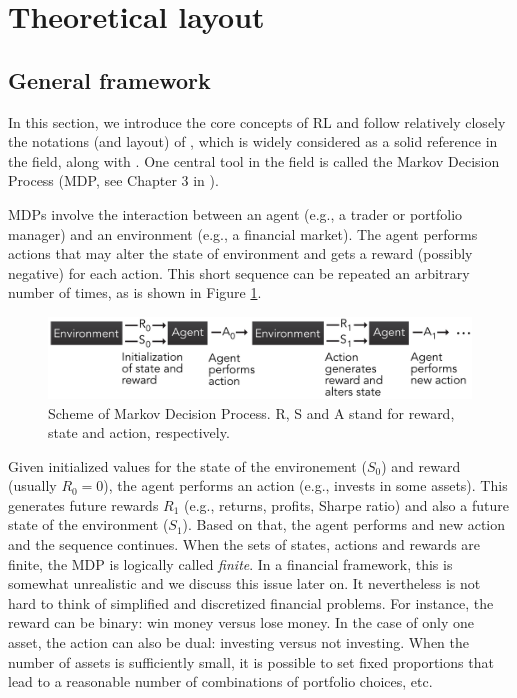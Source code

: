 \documentclass[]{krantz}
\theoremstyle{definition}
\theoremstyle{definition}
\theoremstyle{definition}
\theoremstyle{remark}
\begin{document}
\hypertarget{theoretical-layout}{%
\section{Theoretical layout}\label{theoretical-layout}}

\hypertarget{general-framework}{%
\subsection{General framework}\label{general-framework}}

In this section, we introduce the core concepts of RL and follow
relatively closely the notations (and layout) of
\citet{sutton2018reinforcement}, which is widely considered as a solid
reference in the field, along with \citet{bertsekas2017dynamic}. One
central tool in the field is called the Markov Decision Process (MDP,
see Chapter 3 in \citet{sutton2018reinforcement}).

MDPs involve the interaction between an agent (e.g., a trader or
portfolio manager) and an environment (e.g., a financial market). The
agent performs actions that may alter the state of environment and gets
a reward (possibly negative) for each action. This short sequence can be
repeated an arbitrary number of times, as is shown in Figure
\ref{fig:mdpscheme}.

\begin{figure}[b]

{\centering \includegraphics[width=500px]{images/MDP_scheme} 

}

\caption{Scheme of Markov Decision Process. R, S and A stand for reward, state and action, respectively.}\label{fig:mdpscheme}
\end{figure}

Given initialized values for the state of the environement (\(S_0\)) and
reward (usually \(R_0=0\)), the agent performs an action (e.g., invests
in some assets). This generates future rewards \(R_1\) (e.g., returns,
profits, Sharpe ratio) and also a future state of the environment
(\(S_1\)). Based on that, the agent performs and new action and the
sequence continues. When the sets of states, actions and rewards are
finite, the MDP is logically called \emph{finite}. In a financial
framework, this is somewhat unrealistic and we discuss this issue later
on. It nevertheless is not hard to think of simplified and discretized
financial problems. For instance, the reward can be binary: win money
versus lose money. In the case of only one asset, the action can also be
dual: investing versus not investing. When the number of assets is
sufficiently small, it is possible to set fixed proportions that lead to
a reasonable number of combinations of portfolio choices, etc.
\end{document}
